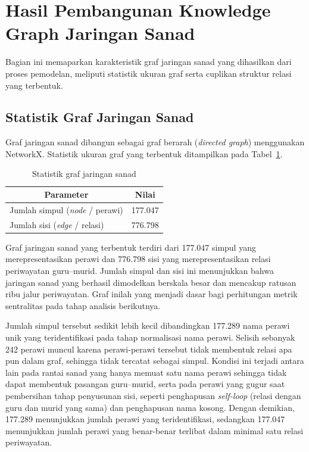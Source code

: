 \section{Hasil Pembangunan Knowledge Graph Jaringan Sanad}
Bagian ini memaparkan karakteristik graf jaringan sanad yang dihasilkan dari proses pemodelan, meliputi statistik ukuran graf serta cuplikan struktur relasi yang terbentuk.

\subsection{Statistik Graf Jaringan Sanad}
Graf jaringan sanad dibangun sebagai graf berarah (\textit{directed graph}) menggunakan NetworkX. Statistik ukuran graf yang terbentuk ditampilkan pada Tabel~\ref{tab:statistik-graf}.

\begin{table}[H]
\centering
\caption{Statistik graf jaringan sanad}
\label{tab:statistik-graf}
\renewcommand{\arraystretch}{1.3}
\begin{tabular}{|p{7cm}|c|}
\hline
\multicolumn{1}{|c|}{\textbf{Parameter}} & \multicolumn{1}{c|}{\textbf{Nilai}} \\
\hline
Jumlah simpul (\textit{node} / perawi) & 177.047 \\
\hline
Jumlah sisi (\textit{edge} / relasi) & 776.798 \\
\hline
\end{tabular}
\end{table}

Graf jaringan sanad yang terbentuk terdiri dari 177.047 simpul yang merepresentasikan perawi dan 776.798 sisi yang merepresentasikan relasi periwayatan guru--murid. Jumlah simpul dan sisi ini menunjukkan bahwa jaringan sanad yang berhasil dimodelkan berskala besar dan mencakup ratusan ribu jalur periwayatan. Graf inilah yang menjadi dasar bagi perhitungan metrik sentralitas pada tahap analisis berikutnya.

Jumlah simpul tersebut sedikit lebih kecil dibandingkan 177.289 nama perawi unik yang teridentifikasi pada tahap normalisasi nama perawi. Selisih sebanyak 242 perawi muncul karena perawi-perawi tersebut tidak membentuk relasi apa pun dalam graf, sehingga tidak tercatat sebagai simpul. Kondisi ini terjadi antara lain pada rantai sanad yang hanya memuat satu nama perawi sehingga tidak dapat membentuk pasangan guru--murid, serta pada perawi yang gugur saat pembersihan tahap penyusunan sisi, seperti penghapusan \textit{self-loop} (relasi dengan guru dan murid yang sama) dan penghapusan nama kosong. Dengan demikian, 177.289 menunjukkan jumlah perawi yang teridentifikasi, sedangkan 177.047 menunjukkan jumlah perawi yang benar-benar terlibat dalam minimal satu relasi periwayatan.

